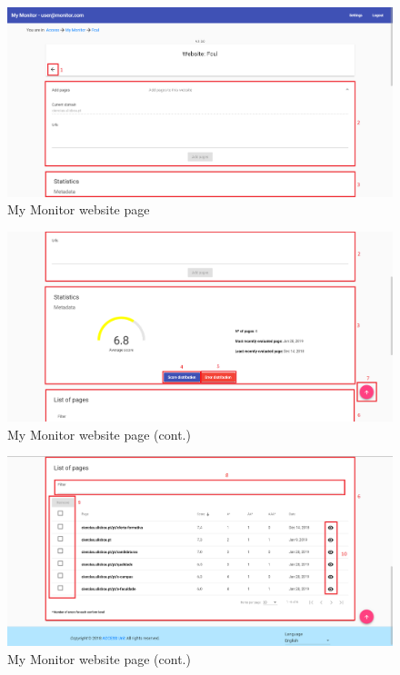 \begin{figure}[H]
    \centering
    \includegraphics[width=\linewidth]{lib/images/monitor/monitor_website_page.png}
    \caption{My Monitor website page}
    \label{fig:monitor_website_page}
\end{figure}

\begin{figure}[H]
    \centering
    \includegraphics[width=\linewidth]{lib/images/monitor/monitor_website_page_2.png}
    \caption{My Monitor website page (cont.)}
    \label{fig:monitor_website_page_2}
\end{figure}

\begin{figure}[H]
    \centering
    \includegraphics[width=\linewidth]{lib/images/monitor/monitor_website_page_3.png}
    \caption{My Monitor website page (cont.)}
    \label{fig:monitor_website_page_3}
\end{figure}

